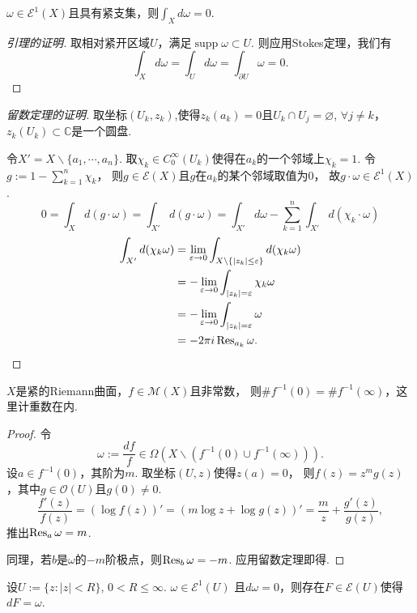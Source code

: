 \begin{lemma}
	$\omega\in \mathcal{E}^1(X)$且具有紧支集，则$\int_X d\omega=0$.
\end{lemma}
\begin{proof}[引理的证明]
    取相对紧开区域$U$，满足$\operatorname{supp}\omega\subset U$.
    则应用Stokes定理，我们有
    $$
        \int_X d\omega=\int_U d\omega=\int_{\partial U} \omega=0.
    $$
\end{proof}
\begin{proof}[留数定理的证明]
	取坐标$(U_k,z_k)$,使得$z_k(a_k)=0$且$U_k\cap U_j=\varnothing$, $\forall j\neq k$，
    $z_k(U_k)\subset \mathbb{C}$是一个圆盘.

	令$X'=X\backslash  \{a_1,\cdots,a_n\}$. 
    取$\chi_k\in C^\infty_0(U_k)$使得在$a_k$的一个邻域上$\chi_k=1$. 
    令$g:=1-\sum\limits_{k=1}^n \chi_k$，
    则$g\in \mathcal{E}(X)$且$g$在$a_k$的某个邻域取值为$0$，
    故$g\cdot \omega\in \mathcal{E}^1(X)$. 
	$$0=\int_Xd(g\cdot \omega)=\int_{X'} d(g\cdot \omega)
    =\int_{X'} d\omega-\sum\limits_{k=1}^n \int_{X'} d(\chi_k\cdot \omega)$$
	\begin{align*}
		\int_{X'} d(\chi_k\omega)
        &=\lim_{\varepsilon\to 0} \int_{X\backslash \{|z_k|\leq \varepsilon\}} d(\chi_k\omega)\\
		&=-\lim_{\varepsilon\to 0} \int_{|z_k|=\varepsilon} \chi_k \omega\\
		&=-\lim_{\varepsilon\to 0} \int_{|z_k|=\varepsilon} \omega\\
		&=-2\pi i \operatorname{Res}_{a_k} \omega.
\end{align*}								
\end{proof}
		
\begin{corollary}
	$X$是紧的Riemann曲面，$f\in \mathscr{M}(X)$且非常数，
    则$\#f^{-1}(0)=\#f^{-1}(\infty)$，这里计重数在内.
\end{corollary}
		
\begin{proof}
	令\[\omega:=\frac{df}{f}\in \Omega(X\backslash (f^{-1}(0)\cup f^{-1}(\infty))).\]
    设$a\in f^{-1}(0)$，其阶为$m$. 取坐标$(U,z)$使得$z(a)=0$，
    则$f(z)=z^mg(z)$，其中$g\in \mathcal{O}(U)$且$g(0)\neq 0$.
	$$\frac{f'(z)}{f(z)}=(\log f(z))'=(m\log z+\log g(z))'
    =\frac{m}{z}+\frac{g'(z)}{g(z)},$$
    推出$\operatorname{Res}_a \omega=m$.

	同理，若$b$是$\omega$的$-m$阶极点，则$\operatorname{Res}_b \omega=-m$. 应用留数定理即得.
\end{proof}
		
\begin{lemma}[Poincaré引理]
	设$U:=\{z:|z|<R\}$, $0<R\leq \infty$. $\omega\in \mathcal{E}^1(U)$
    且$d\omega=0$，则存在$F\in \mathcal{E}(U)$使得$dF=\omega$.	
\end{lemma}
		
